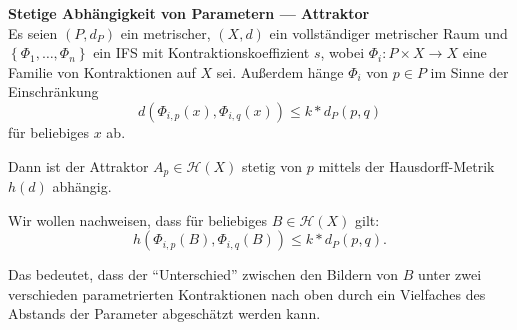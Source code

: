 \documentclass[afourpaper]{latex-classes/handout}
\begin{document}
\begin{theorembox}
  \textbf{Stetige Abhängigkeit von Parametern --- Attraktor} \\
  \vspace{1mm}
  Es seien \( (P, d_P) \) ein metrischer, \( (X,d) \) ein vollständiger metrischer Raum und \( \left \{ \Phi_1, \dots, \Phi_n \right \} \) ein IFS mit Kontraktionskoeffizient \( s \), wobei \( \Phi_i : P \times X \to X \) eine Familie von Kontraktionen auf \( X \) sei. Außerdem hänge \( \Phi_i \) von \( p \in P \) im Sinne der Einschränkung
  \begin{equation*}
    d(\Phi_{i,p}(x), \Phi_{i,q}(x)) \leq k * d_P(p,q)
  \end{equation*}
  für beliebiges \( x \) ab.

  \vspace{1em}
  Dann ist der Attraktor \( A_p \in \mathcal{H}(X) \) stetig von \( p \) mittels der Hausdorff-Metrik \( h(d) \) abhängig.
\end{theorembox}

Wir wollen nachweisen, dass für beliebiges \( B \in \mathcal{H}(X) \) gilt:
\begin{equation*}
  h(\Phi_{i,p}(B), \Phi_{i,q}(B)) \leq k * d_P(p,q)\text{.}
\end{equation*}

Das bedeutet, dass der ``Unterschied'' zwischen den Bildern von \( B \) unter zwei verschieden parametrierten Kontraktionen nach oben durch ein Vielfaches des Abstands der Parameter abgeschätzt werden kann.
\end{document}
